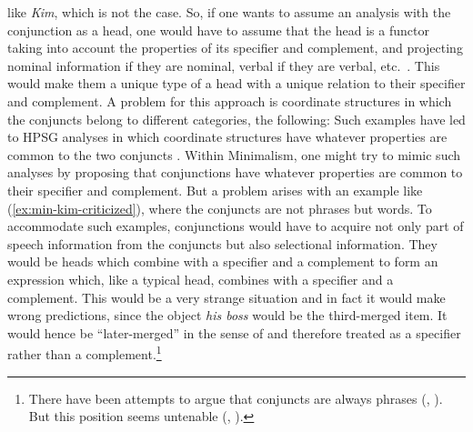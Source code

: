 \documentclass[output=paper
                ,modfonts
                ,nonflat
	        ,collection
	        ,collectionchapter
	        ,collectiontoclongg
 	        ,biblatex
                ,babelshorthands
                ,newtxmath
                ,draftmode
                ,colorlinks, citecolor=brown
]{./langsci/langscibook}
\begin{document}
like \emph{Kim}, which is not the case. So, if one wants to assume an analysis with the conjunction
as a head, one would have to assume that the head is a functor taking into account the properties of
its specifier and complement, and projecting nominal information if they are nominal, verbal if they
are verbal, etc.\ \citep{Steedman91a}. This would make them a unique type of a head with a unique 
relation to their specifier and complement. A problem for this approach is coordinate structures in
which the conjuncts belong to different categories, \eg the following: 
\eal
{}\label{ex:min-hobbs-linguist}
\label{ex:min-hobbs-angry}
\zl 
Such examples have led to HPSG analyses in which coordinate structures have whatever properties are
common to the two conjuncts \citep{Sag2003a-u}. Within Minimalism, one might try to mimic such
analyses by proposing that conjunctions have whatever properties are common to their specifier and
complement. But a problem arises with an example like (\ref{ex:min-kim-criticized}), where the conjuncts are
not phrases but words.
\label{ex:min-kim-criticized}
\z
To accommodate such examples, conjunctions would have to acquire not only part of speech information
from the conjuncts but also selectional information. They would be heads which combine with a
specifier and a complement to form an expression which, like a typical head, combines with a
specifier and a complement. This would be a very strange situation and in fact it would make wrong
predictions, since the object \emph{his boss} would be the third-merged item. It would hence be
``later-merged'' in the sense of \citet[]{Chomsky2008a} and therefore treated as a specifier rather than a complement.\footnote{%
	There have been attempts to argue that conjuncts are always phrases (\citealt{Kayne94a-u}, \citealt{Bruening2018a}). But this position seems untenable (\citealt{Abeille2006a}, \citealt[Section~7]{MuellerLexicalism}).%
}
\end{document}
